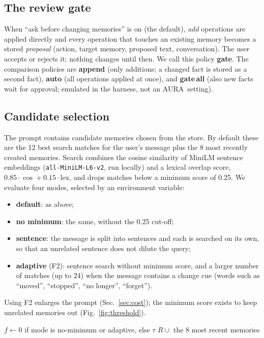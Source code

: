 \IfFileExists{IEEEtran.cls}{\documentclass[journal]{IEEEtran}\def\HAVEIEEE{1}}{\documentclass[10pt,twocolumn]{article}\usepackage[margin=0.7in,columnsep=0.25in]{geometry}}
\newcommand{\aura}{AURA}
\begin{document}
\subsection{The review gate}
When ``ask before changing memories'' is on (the default), \emph{add} operations are applied directly and every operation that touches an existing memory becomes a stored \emph{proposal} (action, target memory, proposed text, conversation). The user accepts or rejects it; nothing changes until then. We call this policy \textbf{gate}. The comparison policies are \textbf{append} (only additions; a changed fact is stored as a second fact), \textbf{auto} (all operations applied at once), and \textbf{gate\,all} (also new facts wait for approval; emulated in the harness, not an \aura\ setting).

\subsection{Candidate selection}
\label{sec:candidates}
The prompt contains candidate memories chosen from the store. By default these are the 12 best search matches for the user's message plus the 8 most recently created memories. Search combines the cosine similarity of MiniLM sentence embeddings \cite{wang2020minilm} (\texttt{all-MiniLM-L6-v2}, run locally) and a lexical overlap score, $0.85\cdot\cos + 0.15\cdot\mathrm{lex}$, and drops matches below a minimum score of 0.25. We evaluate four modes, selected by an environment variable:
\begin{itemize}
\item \textbf{default}: as above;
\item \textbf{no minimum}: the same, without the 0.25 cut-off;
\item \textbf{sentence}: the message is split into sentences and each is searched on its own, so that an unrelated sentence does not dilute the query;
\item \textbf{adaptive} (F2): sentence search without minimum score, and a larger number of matches (up to 24) when the message contains a change cue (words such as ``moved'', ``stopped'', ``no longer'', ``forget'').
\end{itemize}
Using F2 enlarges the prompt (Sec.~\ref{sec:cost}); the minimum score exists to keep unrelated memories out (Fig.~\ref{fig:threshold}).

\begin{algorithm}[t]
\caption{Candidate selection (modes \emph{default} and \emph{adaptive})}
\label{alg:cand}
\small
{}
$f \leftarrow 0$ if mode is no-minimum or adaptive, else $\tau$\;
\Return $R \cup$ the 8 most recent memories\;
\end{algorithm}
\end{document}
